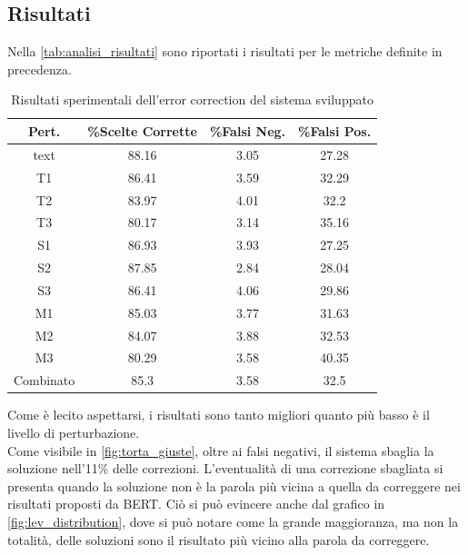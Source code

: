 \documentclass[12pt]{article}
\begin{document}
\subsection{Risultati}

Nella \autoref{tab:analisi_risultati} sono riportati i risultati per le metriche definite in precedenza.
\begin{table}[H]
\centering
\begin{tabular}{cccc}
\textbf{Pert.} & \textbf{\%Scelte Corrette} & \textbf{\%Falsi Neg.} &  \textbf{\%Falsi Pos.} \\ \hline
text& 88.16& 3.05& 27.28\\
T1& 86.41& 3.59& 32.29\\
T2& 83.97& 4.01& 32.2\\
T3& 80.17& 3.14& 35.16\\
S1& 86.93& 3.93& 27.25\\
S2& 87.85& 2.84& 28.04\\
S3& 86.41& 4.06& 29.86\\
M1& 85.03& 3.77& 31.63\\
M2& 84.07& 3.88& 32.53\\
M3& 80.29& 3.58& 40.35\\
Combinato& 85.3& 3.58& 32.5\\
\end{tabular}
\caption{Risultati sperimentali dell'error correction del sistema sviluppato}
\label{tab:analisi_risultati}
\end{table}

Come è lecito aspettarsi, i risultati sono tanto migliori quanto più basso è il livello di perturbazione.\\
Come visibile in \autoref{fig:torta_giuste}, oltre ai falsi negativi, il sistema sbaglia la soluzione nell'11\% delle correzioni. L'eventualità di una correzione sbagliata si presenta quando la soluzione non è la parola più vicina a quella da correggere nei risultati proposti da BERT. Ciò si può evincere anche dal grafico in \autoref{fig:lev_distribution}, dove si può notare come la grande maggioranza, ma non la totalità, delle soluzioni sono il risultato più vicino alla parola da correggere.
\end{document}
